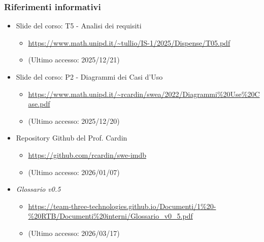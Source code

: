 \documentclass[a4paper,12pt]{article}
\begin{document}
{{            \subsubsection{Riferimenti informativi} {
                \begin{itemize}
                    \item Slide del corso: T5 - Analisi dei requisiti
                    \begin{itemize}
                        \item \url{https://www.math.unipd.it/~tullio/IS-1/2025/Dispense/T05.pdf}
                        \item[] (Ultimo accesso: 2025/12/21)
                    \end{itemize}
                    \item Slide del corso: P2 - Diagrammi dei Casi d'Uso
                    \begin{itemize}
                        \item \url{https://www.math.unipd.it/~rcardin/swea/2022/Diagrammi\%20Use\%20Case.pdf}
                        \item[] (Ultimo accesso: 2025/12/20)
                    \end{itemize}
                    \item Repository Github del Prof. Cardin
                    \begin{itemize}
                        \item \url{https://github.com/rcardin/swe-imdb}
                        \item[] (Ultimo accesso: 2026/01/07)
                    \end{itemize}
                    \item \textit{Glossario v0.5}
                    \begin{itemize}
                        \item \url{https://team-three-technologies.github.io/Documenti/1%20-%20RTB/Documenti%20interni/Glossario_v0_5.pdf}
                        \item[] (Ultimo accesso: 2026/03/17)
                    \end{itemize}
                \end{itemize}
            }
        }
    }

    \newpage
\end{document}

